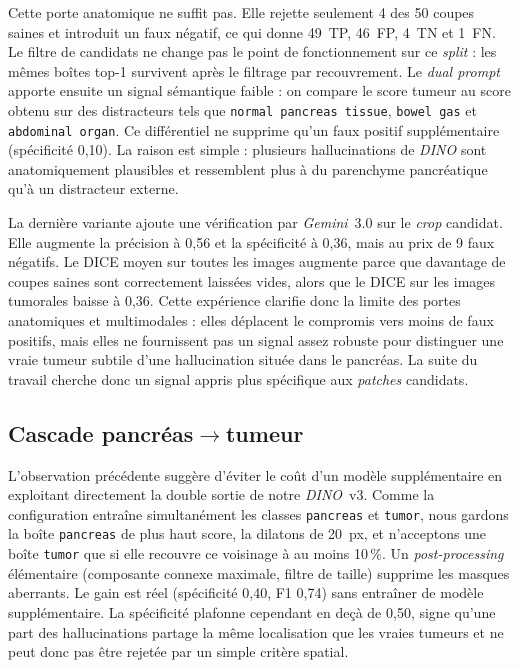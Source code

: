\documentclass{article}
\begin{document}
Cette porte anatomique ne suffit pas. Elle rejette seulement 4 des 50 coupes
saines et introduit un faux n\'egatif, ce qui donne 49~TP, 46~FP, 4~TN et
1~FN. Le filtre de candidats ne change pas le point de fonctionnement sur ce
\emph{split} : les m\^emes bo\^ites top-1 survivent apr\`es le filtrage par
recouvrement. Le \emph{dual prompt} apporte ensuite un signal s\'emantique
faible : on compare le score tumeur au score obtenu sur des distracteurs tels
que \texttt{normal pancreas tissue}, \texttt{bowel gas} et
\texttt{abdominal organ}. Ce diff\'erentiel ne supprime qu'un faux positif
suppl\'ementaire (sp\'ecificit\'e 0{,}10). La raison est simple : plusieurs
hallucinations de \emph{DINO} sont anatomiquement plausibles et ressemblent
plus \`a du parenchyme pancr\'eatique qu'\`a un distracteur externe.

La derni\`ere variante ajoute une v\'erification par \emph{Gemini}~3.0 sur
le \emph{crop} candidat. Elle augmente la pr\'ecision \`a 0{,}56 et la
sp\'ecificit\'e \`a 0{,}36, mais au prix de 9 faux n\'egatifs. Le DICE moyen
sur toutes les images augmente parce que davantage de coupes saines sont
correctement laiss\'ees vides, alors que le DICE sur les images tumorales
baisse \`a 0{,}36. Cette exp\'erience clarifie donc la limite des portes
anatomiques et multimodales : elles d\'eplacent le compromis vers moins de
faux positifs, mais elles ne fournissent pas un signal assez robuste pour
distinguer une vraie tumeur subtile d'une hallucination situ\'ee dans le
pancr\'eas. La suite du travail cherche donc un signal appris plus sp\'ecifique
aux \emph{patches} candidats.

\subsection{\texorpdfstring{Cascade pancr\'eas$\rightarrow$tumeur}{Cascade pancreas vers tumeur}}

L'observation pr\'ec\'edente sugg\`ere d'\'eviter le co\^ut d'un mod\`ele
suppl\'ementaire en exploitant directement la double sortie de notre
\emph{DINO}~v3. Comme la configuration entra\^ine simultan\'ement les classes
\texttt{pancreas} et \texttt{tumor}, nous gardons la bo\^ite \texttt{pancreas}
de plus haut score, la dilatons de 20~px, et n'acceptons une bo\^ite
\texttt{tumor} que si elle recouvre ce voisinage \`a au moins 10\,\%. Un
\emph{post-processing} \'el\'ementaire (composante connexe maximale, filtre
de taille) supprime les masques aberrants. Le gain est r\'eel
(sp\'ecificit\'e 0{,}40, F1 0{,}74) sans entra\^iner de mod\`ele
suppl\'ementaire. La sp\'ecificit\'e plafonne cependant en de\c{c}\`a de
0{,}50, signe qu'une part des hallucinations partage la m\^eme localisation
que les vraies tumeurs et ne peut donc pas \^etre rejet\'ee par un simple
crit\`ere spatial.
\end{document}
